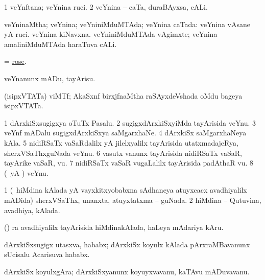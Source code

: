 \bentry
{} 
\gl{\nA}
\expl{}
\bmng
\bnum
\num{1} veYnftana; veYnina ruci. 
\num{2} veYnina -- caTa, duraBAyxsa, cALi. 
\enum
\emng
\eentry

\bentry
{} 
\gl{\gu}
\expl{}
\bmng
 veYninaMtha; veYnina; veYniniMduMTAda; veYnina caTada:  veYnina vAsane yA ruci.  veYnina kiNavxna.  veYniniMduMTAda vAgimxte; veYnina amaliniMduMTAda haraTuva cALi. 
\emng
\eentry

\bentry 
{} 
\gl{\nA}
\expl{\F}
\bmng
= \hyperref{kandict_r.pdf}{R}{rose}{rose}. 
\emng
\eentry

\bentry
{} 
\gl{\sakirx}
\expl{}
\bmng
 veYnanunx mADu, tayArisu. 
\emng
\eentry

\bentry
{} 
\gl{\nA}
\expl{}
\bmng
 (isipxVTATa) viMTf; AkaSxnf birxjfnaMtha raSAyxdeVshada oMdu bageya isipxVTATa. 
\emng
\eentry

\bentry
{} 
\gl{\nA}
\expl{}
\bmng
\bnum
\num{1} dArxkiSxsugigxya oTuTx Pasalu. 
\num{2} sugigxdArxkiSxyiMda tayArisida veYnu. 
\num{3} veYnf mADalu sugigxdArxkiSxya saMgarxhaNe. 
\num{4} dArxkiSx saMgarxhaNeya kAla. 
\num{5} nidiRSaTx vaSaRdalilx yA jilelxyalilx tayArisida utatxmadajeRya, sherxVSaThxguNada veYnu. 
\num{6} vasutx \mo vanunx tayArisida nidiRSaTx vaSaR, tayArike vaSaR, \mo vu. 
\num{7} nidiRSaTx vaSaR \mo vugaLalilx tayArisida padAthaR \mo vu. 
\num{8} (\kAparx\ yA \rUpa) veYnu. 
\enum
\emng
\eentry

\bentry
{} 
\gl{\gu}
\expl{}
\bmng
\bnum
\num{1} (\kanmu\ hiMdina kAlada yA vayxkitxyobabxna sAdhaneya atuyxcacx avadhiyalilx mADida) sherxVSaThx, unanxta, atuyxtatxma -- guNada. 
\num{2} hiMdina -- Qutuvina, avadhiya, kAlada. 
\enum
\emng
\eentry

\bentry
{}
\gl{\nA}
\expl{}
\bmng
 (\birx) ra avadhiyalilx tayArisida hiMdinakAlada, haLeya mAdariya kAru. 
\emng
\eentry

\bentry
{}
\gl{\nA}
\expl{}
\bmng
 dArxkiSxsugigx utasxva, hababx; dArxkiSx koyulx kAlada pArxraMBavanunx sUcisalu Acarisuva hababx. 
\emng
\eentry

\bentry
{} 
\gl{\nA}
\expl{}
\bmng
 dArxkiSx koyulxgAra; dArxkiSxyanunx koyuyxvavanu, kaTAvu mADuvavanu. 
\emng
\eentry

